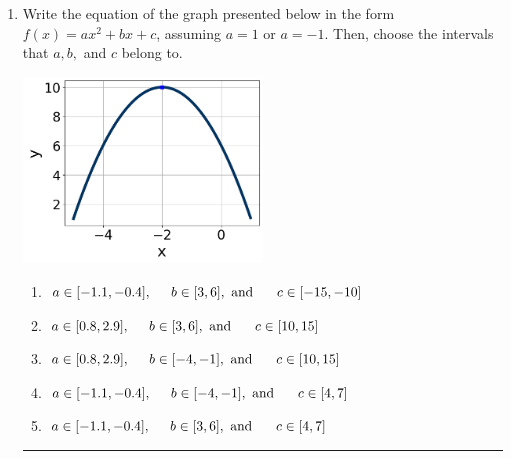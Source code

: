 \documentclass[14pt]{extbook}
\newcommand{\litem}[1]{\item#1\hspace*{-1cm}\rule{\textwidth}{0.4pt}}
\begin{document}
\begin{enumerate}
{\begin{enumerate}[label=\Alph*.]
\end{enumerate} }
\litem{
Write the equation of the graph presented below in the form $f(x)=ax^2+bx+c$, assuming  $a=1$ or $a=-1$. Then, choose the intervals that $a, b,$ and $c$ belong to.
\begin{center}
    \includegraphics[width=0.5\textwidth]{../Figures/quadraticGraphToEquationC.png}
\end{center}
\begin{enumerate}[label=\Alph*.]
\item \( a \in [-1.1, -0.4], \hspace*{5mm} b \in [3, 6], \text{ and } \hspace*{5mm} c \in [-15, -10] \)
\item \( a \in [0.8, 2.9], \hspace*{5mm} b \in [3, 6], \text{ and } \hspace*{5mm} c \in [10, 15] \)
\item \( a \in [0.8, 2.9], \hspace*{5mm} b \in [-4, -1], \text{ and } \hspace*{5mm} c \in [10, 15] \)
\item \( a \in [-1.1, -0.4], \hspace*{5mm} b \in [-4, -1], \text{ and } \hspace*{5mm} c \in [4, 7] \)
\item \( a \in [-1.1, -0.4], \hspace*{5mm} b \in [3, 6], \text{ and } \hspace*{5mm} c \in [4, 7] \)

\end{enumerate} }
\end{enumerate}
\end{document}
